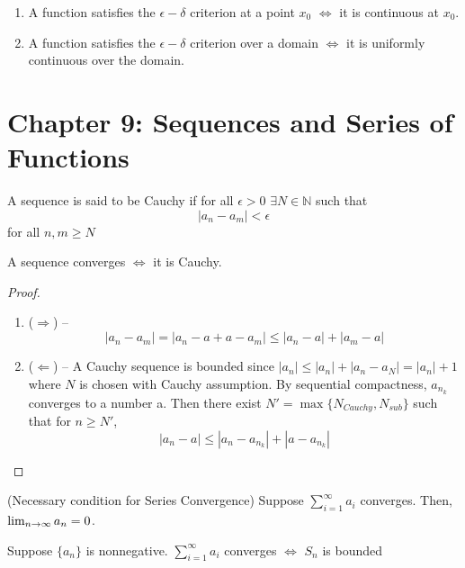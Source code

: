 \documentclass{article}
\begin{document}
\begin{theorem}
    \hfill
    \begin{enumerate}
        \item A function satisfies the $\epsilon-\delta$ criterion at a point $x_0$
        $\Longleftrightarrow$ it is continuous at $x_0$.
        \item A function satisfies the $\epsilon-\delta$ criterion over a domain 
        $\Longleftrightarrow$ it is uniformly continuous over the domain.
    \end{enumerate}
\end{theorem}
\section{Chapter 9: Sequences and Series of Functions}

\begin{definition}
    A sequence is said to be Cauchy if for all $\epsilon>0$ $\exists N\in \mathbb{N}$
    such that 
    \[ |a_n - a_m| < \epsilon \] for all $n,m \geq N$
\end{definition}

\begin{theorem}
    A sequence converges $\Longleftrightarrow$ it is Cauchy.
\end{theorem}

\begin{proof}
    \hfill
    \begin{enumerate}
        \item ($\Rightarrow$) -- 
        \[ |a_n - a_m| = |a_n -a +a -a_m| \leq |a_n -a| + |a_m - a| \]
        \item ($\Leftarrow$) --
        A Cauchy sequence is bounded since $|a_n| \leq |a_n| + |a_n-a_N| = |a_n| + 1$
        where $N$ is chosen with Cauchy assumption. By sequential compactness, $a_{n_k}$ converges to
        a number a. Then there exist $N'=\max\{N_{Cauchy},N_{sub}\}$ such that for
        $n\geq N'$,
        \[ |a_n -a | \leq |a_n-a_{n_k}| + |a - a_{n_k}| \]
    \end{enumerate}
\end{proof}

\def\series{\sum_{i=1}^\infty a_i}

\begin{theorem}
    (Necessary condition for Series Convergence)
    Suppose $\series$ converges. Then, $\lim_{n \to \infty} a_n = 0$.
\end{theorem}

\begin{theorem}
    Suppose $\{a_n\}$ is nonnegative. $\series$ converges $\Longleftrightarrow$
    $S_n$ is bounded
\end{theorem}
\end{document}
